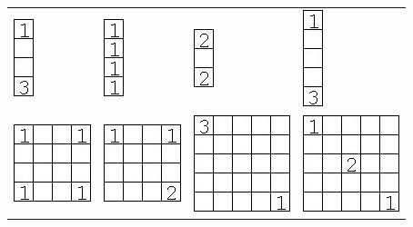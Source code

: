 \begin{appendix}
{\begin{tabular}{m{4cm}m{4cm}m{4cm}m{4cm}}
\centerline{\includegraphics{imgs/models/model9}}&\centerline{\includegraphics{imgs/models/model10}}&\centerline{\includegraphics{imgs/models/model11}}&\centerline{\includegraphics{imgs/models/model12}}\\
\centerline{\includegraphics{imgs/models/model14}}&\centerline{\includegraphics{imgs/models/model15}}&\centerline{\includegraphics{imgs/models/model16}}&\centerline{\includegraphics{imgs/models/model17}}\\

\end{tabular}}
\end{appendix}
